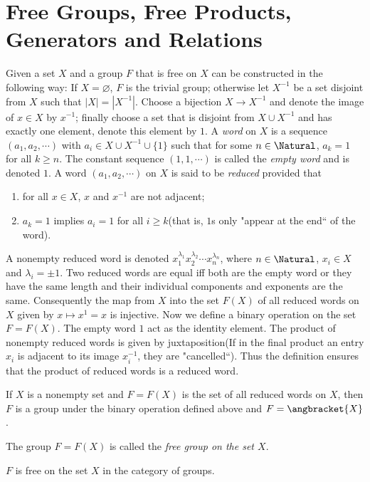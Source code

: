 \section{Free Groups, Free Products, Generators and Relations}
\begin{definition}
	Given a set $ X $ and a group $ F $ that is free on $ X $ can be constructed in the following way: If $ X= \varnothing $, $ F $ is the trivial group; otherwise let $ X^{-1} $  be a set disjoint from $ X $ such that $ |X| = |X^{-1}| $. Choose a bijection $ X \to X^{-1} $ and denote the image of $ x \in X $ by $ x^{-1} $; finally choose a set that is disjoint from $ X \cup X^{-1} $ and has exactly one element, denote this element by $ 1 $. A \textit{word} on $ X $ is a sequence $ (a_1,a_2,\cdots) $ with $ a_i \in X \cup X^{-1} \cup \{1 \} $ such that for some $ n \in \Natural $, $ a_k=1 $ for all $ k \geqslant n $. The constant sequence $ (1,1,\cdots) $ is called the \textit{empty word} and is denoted $ 1 $. A word $ (a_1,a_2,\cdots) $ on $ X $ is said to be \textit{reduced} provided that
	\begin{enumerate}
		\item for all $ x \in X $, $ x $ and $ x^{-1} $ are not adjacent;
		\item $ a_k=1 $ implies $ a_i=1 $ for all $ i \geqslant k $(that is, $ 1 $s only "appear at the end`` of the word).
	\end{enumerate} 
A nonempty reduced word is denoted $ x_1^{\lambda_1}x_2^{\lambda_2}\cdots x_n^{\lambda_n} $, where $ n \in \Natural $, $ x_i \in X $ and $ \lambda_i = \pm 1 $. Two reduced words are equal iff both are the empty word or they have the same length and their individual components and exponents are the same. Consequently the map from $ X $ into the set $ F(X) $ of all reduced words on $ X $ given by $ x \mapsto x^1 = x $ is injective. Now we define a binary operation on the set $ F = F(X) $. The empty word $ 1 $ act as the identity element. The product of nonempty reduced words is given by juxtaposition(If in the final product an entry $ x_i $ is adjacent to its image $ x_i^{-1} $, they are "cancelled``). Thus the definition ensures that the product of reduced words is a reduced word.
\end{definition}
\begin{theorem}
	If $ X $ is a nonempty set and $ F=F(X) $ is the set of all reduced words on $ X $, then $ F $ is a group under the binary operation defined above and $ F = \angbracket{X} $.
\end{theorem}
The group $ F=F(X) $ is called the \textit{free group on the set $ X $}.
\begin{theorem}
	$ F $ is free on the set $ X $ in the category of groups.
\end{theorem}

